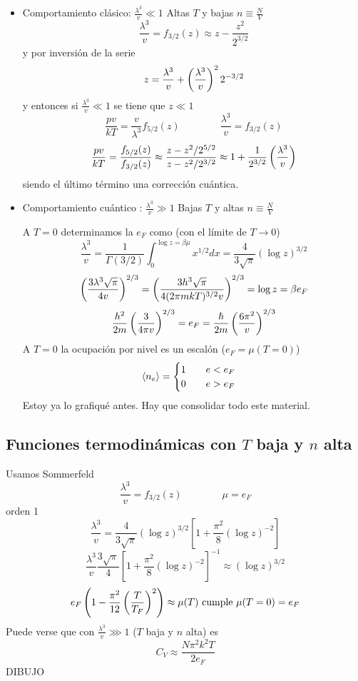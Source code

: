 \documentclass[10pt,oneside]{CBFT_book}
\begin{document}
\begin{itemize}
 \item Comportamiento clásico: $\frac{\lambda^3}{v} \ll 1$ Altas $T$ y bajas $n\equiv \frac{N}{V}$ 
 \[
	\frac{\lambda^3}{v} = f_{3/2}(z) \approx z - \frac{z^2}{2^{3/2}}
 \]
 y por inversión de la serie 
 \[
	z = \frac{\lambda^3}{v} + \left( \frac{ \lambda^3 }{ v } \right)^2 2^{-3/2}
 \]
 y entonces si $\frac{\lambda^3}{v} \ll 1$ se tiene que $ z \ll 1 $
 \[
	\frac{pv}{kT} = \frac{v}{\lambda^3} f_{5/2}(z) \qquad \qquad \frac{\lambda^3}{v} = f_{3/2}(z)
 \]
 \[
	\frac{pv}{kT} = \frac{f_{5/2}(z)}{f_{3/2}(z)} \approx \frac{z - z^2/2^{5/2}}{z - z^2/2^{3/2}}
	\approx 1 + \frac{1}{2^{3/2}} \left( \frac{ \lambda^3 }{ v } \right)
 \]
 siendo el último término una corrección cuántica.
 
  \item Comportamiento cuántico : $\frac{\lambda^3}{v} \gg 1$ Bajas $T$ y altas $n\equiv \frac{N}{V}$ 
  
  A $ T = 0 $ determinamos la $ e_F $ como (con el límite de $T\to 0$)
  \[
	\frac{\lambda^3}{v} = \frac{1}{\Gamma(3/2)} \int_0^{\log z = \beta\mu} x^{1/2} dx = 
	 \frac{4}{ 3 \sqrt{\pi} } (\log z )^{3/2}
  \]
  \[
	\left( \frac{  3  \lambda^3  \sqrt{\pi}  }{ 4v } \right)^{2/3} = \left( \frac{  3  h^3  \sqrt{\pi}  }{ 4(2\pi m k T)^{3/2}v } \right)^{2/3} 
	= \log z =  \beta e_F
  \]
  \[
	\frac{h^2}{2m}\left( \frac{ 3 }{ 4\pi v } \right)^{2/3} = e_F = \frac{\hbar}{2m}\left( \frac{ 6\pi^2 }{ v } \right)^{2/3}
  \]
  A $ T = 0 $ la ocupación por nivel es un escalón ($e_F = \mu(T=0) $) 
  \[
	\braket{n_e} = 	\begin{cases}
			1 \qquad e < e_F \\
			0 \qquad e > e_F
			\end{cases}
  \]
  Estoy ya lo grafiqué antes. Hay que consolidar todo este material.
\end{itemize}

\subsection{Funciones termodinámicas con $T$ baja y $n$ alta}

Usamos Sommerfeld
\[
	\frac{\lambda^3}{v} = f_{3/2}(z) \qquad  \qquad \mu = e_F
\]
orden 1
\[
	\frac{\lambda^3}{v} =  
	\frac{4}{3\sqrt{\pi} } (\log z )^{3/2} \left[ 1 + \frac{\pi^2}{8}(\log z )^{-2} \right] 
\]
\[
	\frac{\lambda^3}{v} \frac{3\sqrt{\pi} }{4} \left[ 1 + \frac{\pi^2}{8}(\log z )^{-2} \right]^{-1} 
	\approx (\log z)^{3/2} 
\]
\[
	e_F \left( 1- \frac{\pi^2}{12}\left( \frac{ T }{ T_F } \right)^2 \right) \approx \mu( T ) \text{ cumple $\mu(T=0)=e_F$}
\]
Puede verse que con $ \frac{\lambda^3}{v} \ggg 1 $ ($T$ baja y $n$ alta) es
\[
	C_V \approx \frac{N \pi^2 k^2 T}{2 e_F}
\]
DIBUJO
\end{document}
